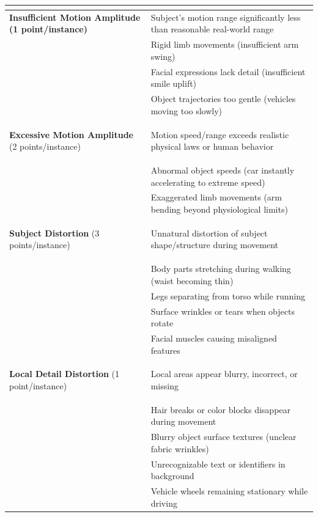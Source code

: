 \documentclass{article}
\begin{document}
\begin{table}[h]
\centering
\small
\renewcommand{\arraystretch}{1.2}
\setlength{\tabcolsep}{12pt}
\begin{tabular}{>{\raggedright\arraybackslash\bfseries}p{4cm}>{\raggedright\arraybackslash}p{11cm}}
\toprule
\multicolumn{2}{l}{\large\bfseries Video Motion Quality Assessment Criteria} \\
\midrule

\textbf{Insufficient Motion Amplitude} \newline (1 point/instance) & 
Subject's motion range significantly less than reasonable real-world range\\[0.5ex]
& Rigid limb movements (insufficient arm swing)\\[0.5ex]
& Facial expressions lack detail (insufficient smile uplift)\\[0.5ex]
& Object trajectories too gentle (vehicles moving too slowly)\\[0.5ex]
\midrule

\textbf{Excessive Motion Amplitude} \newline (2 points/instance) & 
Motion speed/range exceeds realistic physical laws or human behavior\\[0.5ex]
& Abnormal object speeds (car instantly accelerating to extreme speed)\\[0.5ex]
& Exaggerated limb movements (arm bending beyond physiological limits)\\[0.5ex]
\midrule

\textbf{Subject Distortion} \newline (3 points/instance) & 
Unnatural distortion of subject shape/structure during movement\\[0.5ex]
& Body parts stretching during walking (waist becoming thin)\\[0.5ex]
& Legs separating from torso while running\\[0.5ex]
& Surface wrinkles or tears when objects rotate\\[0.5ex]
& Facial muscles causing misaligned features\\[0.5ex]
\midrule

\textbf{Local Detail Distortion} \newline (1 point/instance) & 
Local areas appear blurry, incorrect, or missing\\[0.5ex]
& Hair breaks or color blocks disappear during movement\\[0.5ex]
& Blurry object surface textures (unclear fabric wrinkles)\\[0.5ex]
& Unrecognizable text or identifiers in background\\[0.5ex]
& Vehicle wheels remaining stationary while driving\\[0.5ex]
\midrule


\end{tabular}
\end{table}
\end{document}

